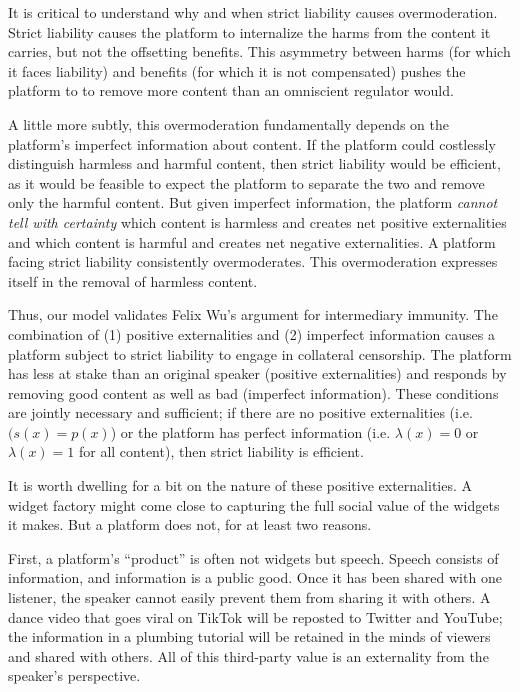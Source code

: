It is critical to understand why and when strict liability causes overmoderation. Strict liability causes the platform to internalize the harms from the content it carries, but not the offsetting benefits. This asymmetry between harms (for which it faces liability) and benefits (for which it is not compensated) pushes the platform to to remove more content than an omniscient regulator would.

A little more subtly, this overmoderation fundamentally depends on the platform's imperfect information about content. If the platform could costlessly distinguish harmless and harmful content, then strict liability would be efficient, as it would be feasible to expect the platform to separate the two and remove only the harmful content. But given imperfect information, the platform \emph{cannot tell with certainty} which content is harmless and creates net positive externalities and which content is harmful and creates net negative externalities. A platform facing strict liability consistently overmoderates. This overmoderation expresses itself in the removal of harmless content.

Thus, our model validates Felix Wu's argument for intermediary immunity. The combination of (1) positive externalities and (2) imperfect information causes a platform subject to strict liability to engage in collateral censorship. The platform has less at stake than an original speaker (positive externalities) and responds by removing good content as well as bad (imperfect information). These conditions are jointly necessary and sufficient; if there are no positive externalities (i.e. $(s(x) = p(x)$) or the platform has perfect information (i.e. $\lambda(x) =0 $ or $\lambda(x) = 1$ for all content), then strict liability is efficient.

It is worth dwelling for a bit on the nature of these positive externalities. A widget factory might come close to capturing the full social value of the widgets it makes. But a platform does not, for at least two reasons.

First, a platform's ``product'' is often not widgets but speech. Speech consists of information, and information is a public good. Once it has been shared with one listener, the speaker cannot easily prevent them from sharing it with others. A dance video that goes viral on TikTok will be reposted to Twitter and YouTube; the information in a plumbing tutorial will be retained in the minds of viewers and shared with others. All of this third-party value is an externality from the speaker's perspective. 

